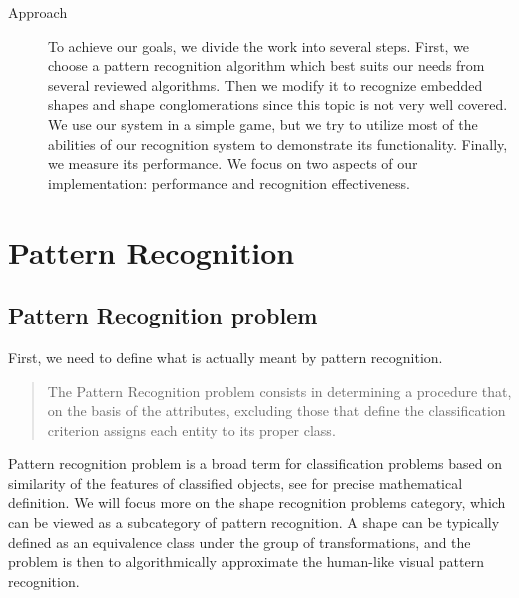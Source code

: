 \begin{description}
\item [Approach]
To achieve our goals, we divide the work into several steps. First, we choose a pattern recognition algorithm which best suits our needs from several reviewed algorithms. Then we modify it to recognize embedded shapes and shape conglomerations since this topic is not very well covered. We use our system in a simple game, but we try to utilize most of the abilities of our recognition system to demonstrate its functionality. Finally, we measure its performance. We focus on two aspects of our implementation: performance and recognition effectiveness.

\end{description}

\chapter{Pattern Recognition}

\section{Pattern Recognition problem}
First, we need to define what is actually meant by pattern recognition. \begin{quotation}
The Pattern Recognition problem consists in determining a procedure that, on the basis of the attributes, excluding those that define the classification criterion assigns each entity to its proper class.
\end{quotation} \cite{formalMethods}
 Pattern recognition problem is a broad term for classification problems based on similarity of the features of classified objects, see \citet{formatMethods} for precise mathematical definition. We will focus more on the shape recognition problems category, which can be viewed as a subcategory of pattern recognition. A shape can be typically defined as an equivalence class under the group of transformations, and the problem is then to algorithmically approximate the human-like visual pattern recognition. 

